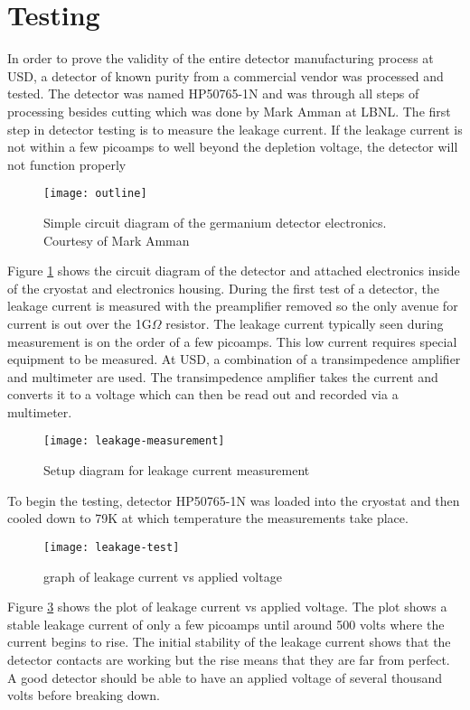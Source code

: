 \section{Testing}
In order to prove the validity of the entire detector manufacturing process at USD, a detector of known purity from a commercial vendor was processed and tested.
The detector was named HP50765-1N and was through all steps of processing besides cutting which was done by Mark Amman at LBNL.
The first step in detector testing is to measure the leakage current.
If the leakage current is not within a few picoamps to well beyond the depletion voltage, the detector will not function properly
\begin{figure}[htpb]
\centering
\texttt{[image: outline]}
\caption{Simple circuit diagram of the germanium detector electronics. Courtesy of Mark Amman}
\label{fig:outline}
\end{figure}
Figure \ref{fig:outline} shows the circuit diagram of the detector and attached electronics inside of the cryostat and electronics housing.
During the first test of a detector, the leakage current is measured with the preamplifier removed so the only avenue for current is out over the 1G$\Omega$ resistor.
The leakage current typically seen during measurement is on the order of a few picoamps.
This low current requires special equipment to be measured.
At USD, a combination of a transimpedence amplifier and multimeter are used.
The transimpedence amplifier takes the current and converts it to a voltage which can then be read out and recorded via a multimeter.
\begin{figure}[htpb]
\centering
\texttt{[image: leakage-measurement]}
\caption{Setup diagram for leakage current measurement}
\label{fig:leakage-measurement}
\end{figure}

To begin the testing, detector HP50765-1N was loaded into the cryostat and then cooled down to 79K at which temperature the measurements take place.
\begin{figure}[htpb]
\centering
\texttt{[image: leakage-test]}
\caption{graph of leakage current vs applied voltage}
\label{fig:leakage-test}
\end{figure}
Figure \ref{fig:leakage-test} shows the plot of leakage current vs applied voltage.
The plot shows a stable leakage current of only a few picoamps until around 500 volts where the current begins to rise.
The initial stability of the leakage current shows that the detector contacts are working but the rise means that they are far from perfect.
A good detector should be able to have an applied voltage of several thousand volts before breaking down.

